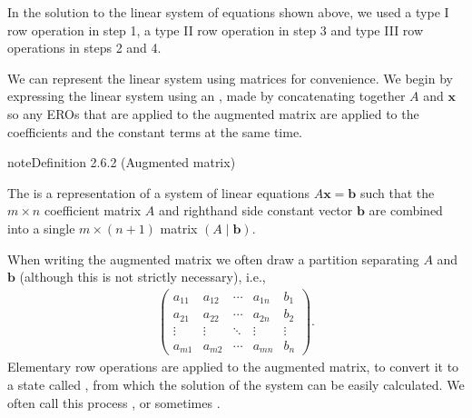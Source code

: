\documentclass[letterpaper,10pt,english]{jupyterBook}
\begin{document}
\sphinxAtStartPar
In the solution to the linear system of equations shown above, we used a type I row operation in step 1, a type II row operation in step 3 and type III row operations in steps 2 and 4.

\sphinxAtStartPar
We can represent the linear system using matrices for convenience. We begin by expressing the linear system using an , made by concatenating together \(A\) and \(\mathbf{x}\) \sphinxhyphen{} so any EROs that are applied to the augmented matrix are applied to the coefficients and the constant terms at the same time.

\ignorespaces \label{_pages/2.3_Gaussian_elimination:augmented-matrix-definition}
\begin{sphinxadmonition}{note}{Definition 2.6.2 (Augmented matrix)}



\sphinxAtStartPar
The  is a representation of a system of linear equations \(A\mathbf{x}=\mathbf{b}\) such that the \(m\times n\) coefficient matrix \(A\) and right\sphinxhyphen{}hand side constant vector \(\mathbf{b}\) are combined into a single \(m\times (n+1)\) matrix \((A \mid \mathbf{b})\).
\end{sphinxadmonition}

\sphinxAtStartPar
When writing the augmented matrix we often draw a partition separating \(A\) and \(\mathbf{b}\) (although this is not strictly necessary), i.e.,
\begin{equation*}
\begin{split} \left(
\begin{array}{cccc|c}
    a_{11} & a_{12} & \cdots & a_{1n} & b_1 \\
    a_{21} & a_{22} & \cdots & a_{2n} & b_2 \\
    \vdots & \vdots & \ddots & \vdots & \vdots \\
    a_{m1} & a_{m2} & \cdots & a_{mn} & b_n
\end{array}
\right). \end{split}
\end{equation*}
\sphinxAtStartPar
Elementary row operations are applied to the augmented matrix, to convert it to a state called , from which the solution of the system can be easily calculated. We often call this process , or sometimes .
\end{document}
